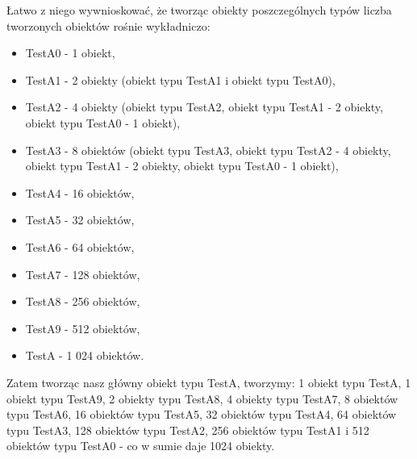 \documentclass[12pt]{article}
\begin{document}
Łatwo z niego wywnioskować, że tworząc obiekty poszczególnych typów liczba tworzonych obiektów rośnie wykładniczo:
\begin{itemize}
	\item TestA0 - 1 obiekt,
	\item TestA1 - 2 obiekty (obiekt typu TestA1 i obiekt typu TestA0),
	\item TestA2 - 4 obiekty (obiekt typu TestA2, obiekt typu TestA1 - 2 obiekty, obiekt typu TestA0 - 1 obiekt),
	\item TestA3 - 8 obiektów (obiekt typu TestA3, obiekt typu TestA2 - 4 obiekty, obiekt typu TestA1 - 2 obiekty, obiekt typu TestA0 - 1 obiekt),
	\item TestA4 - 16 obiektów,
	\item TestA5 - 32 obiektów,
	\item TestA6 - 64 obiektów,
	\item TestA7 - 128 obiektów,
	\item TestA8 - 256 obiektów,
	\item TestA9 - 512 obiektów,
	\item TestA - 1 024 obiektów.
\end{itemize}
Zatem tworząc nasz główny obiekt typu TestA, tworzymy: 1 obiekt typu TestA, 1 obiekt typu TestA9, 2 obiekty typu TestA8, 4 obiekty typu TestA7, 8 obiektów typu TestA6, 16 obiektów typu TestA5, 32 obiektów typu TestA4, 64 obiektów typu TestA3, 128 obiektów typu TestA2, 256 obiektów typu TestA1 i 512 obiektów typu TestA0 - co w sumie daje 1024 obiekty.
\end{document}
